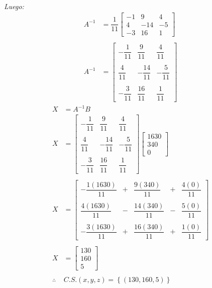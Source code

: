 \documentclass[11pt, a4paper]{article}
\begin{document}
\begin{multicols}{2}
\begin{align*}
  \end{align*}
  \textit{Luego:}
  \begin{align*}
    A^{-1} &= \dfrac{1}{11}\begin{bmatrix}
      -1 & 9 & 4\\
      4 & -14 & -5\\
      -3 & 16 & 1
    \end{bmatrix}\\\\
    A^{-1} &= \begin{bmatrix}
      -\dfrac{1}{11} & \dfrac{9}{11} & \dfrac{4}{11}\\\\
      \dfrac{4}{11} & -\dfrac{14}{11} & -\dfrac{5}{11}\\\\
      -\dfrac{3}{11} & \dfrac{16}{11} & \dfrac{1}{11}
    \end{bmatrix}
  \end{align*}
  \begin{align*}
    X &= A^{-1}B\\
    X &= \begin{bmatrix}
      -\dfrac{1}{11} & \dfrac{9}{11} & \dfrac{4}{11}\\\\
      \dfrac{4}{11} & -\dfrac{14}{11} & -\dfrac{5}{11}\\\\
      -\dfrac{3}{11} & \dfrac{16}{11} & \dfrac{1}{11}
    \end{bmatrix}\begin{bmatrix}
      1630\\
      340\\
      0
    \end{bmatrix}\\\\
    X &= \begin{bmatrix}
      -\dfrac{1\left(1630\right)}{11}&+&\dfrac{9\left(340\right)}{11}&+&\dfrac{4\left(0\right)}{11}\\\\
      \dfrac{4\left(1630\right)}{11}&-&\dfrac{14\left(340\right)}{11}&-&\dfrac{5\left(0\right)}{11}\\\\
      -\dfrac{3\left(1630\right)}{11}&+&\dfrac{16\left(340\right)}{11}&+&\dfrac{1\left(0\right)}{11}
    \end{bmatrix}\\\\
    X &= \begin{bmatrix}
      130\\
      160\\
      5
    \end{bmatrix}\\\\
    \therefore \ &C.S. \left(x,y,z\right) = \left\{\left(130,160,5\right)\right\}
  \end{align*}
\end{multicols}
\newpage
\end{document}
